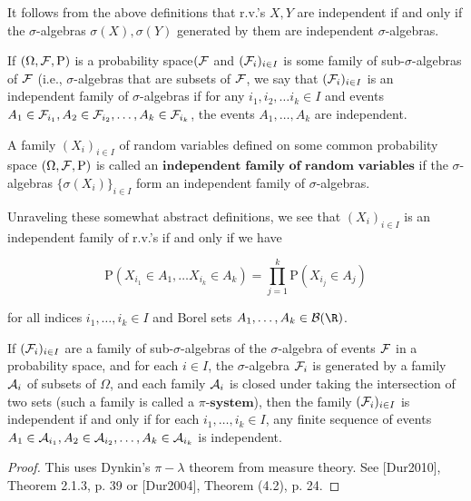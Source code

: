 \noindent It follows from the above definitions that r.v.'s
$X,Y$ are independent if and only if the
$\sigma$-algebras $\sigma(X), \sigma(Y)$ generated by
them are independent $\sigma$-algebras.

\begin{defn}
If $(\Omega, {\cal F}, \mathrm{P})$ is a probability
space$({\cal F}$ and $({\cal F}_i)_{i\in I}$ is some
family of sub-$\sigma$-algebras of ${\cal F}$ (i.e.,
$\sigma$-algebras that are subsets of ${\cal F}$, we
say that $({\cal F}_i)_{i\in I}$ is an independent
family of $\sigma$-algebras if for any
$i_1,i_2,\ldots i_k\in I$ and events
$A_1 \in {\cal F}_{i_1}, A_2 \in {\cal F}_{i_2},
\ldots, A_k \in {\cal F}_{i_k}$,
the events $A_1,\ldots,A_k$ are independent.
\end{defn}

\begin{defn}
A family $(X_i)_{i\in I}$ of random variables defined
on some common probability space
$(\Omega, {\cal F}, \mathrm{P})$ is called an
$\textbf{independent family of random variables}$ if
the $\sigma$-algebras $\{ \sigma(X_i) \}_{i\in I}$
form an independent family of $\sigma$-algebras.
\end{defn}

\noindent Unraveling these somewhat abstract definitions, we
see that $(X_i)_{i\in I}$ is an independent family of
r.v.'s if and only if we have

\[
\mathrm{P}(X_{i_1} \in A_1, \ldots X_{i_k} \in A_k) = \prod_{j=1}^k \mathrm{P}(X_{i_j} \in A_j)
\]

\noindent for all indices $i_1,\ldots,i_k \in I$ and Borel sets
$A_1,\ldots, A_k \in {\cal B}(\R)$.

\begin{thm}
If $({\cal F}_i)_{i\in I}$ are a family of
sub-$\sigma$-algebras of the $\sigma$-algebra of
events ${\cal F}$ in a probability space, and for
each $i\in I$, the $\sigma$-algebra ${\cal F}_i$ is
generated by a family ${\cal A}_i$ of subsets of
$\Omega$, and each family ${\cal A}_i$ is closed
under taking the intersection of two sets (such a
family is called a $\textbf{$\pi$-system}$), then the
family $({\cal F}_i)_{i\in I}$ is independent if and
only if for each $i_1,\ldots,i_k\in I$, any finite
sequence of events
$A_1 \in {\cal A}_{i_1}, A_2\in {\cal A}_{i_2},
\ldots, A_k \in {\cal A}_{i_k}$
is independent.
\end{thm}

\begin{proof}
This uses Dynkin's $\pi-\lambda$ theorem from measure
theory. See [Dur2010], Theorem 2.1.3, p. 39 or
[Dur2004], Theorem (4.2), p. 24.
\end{proof}

